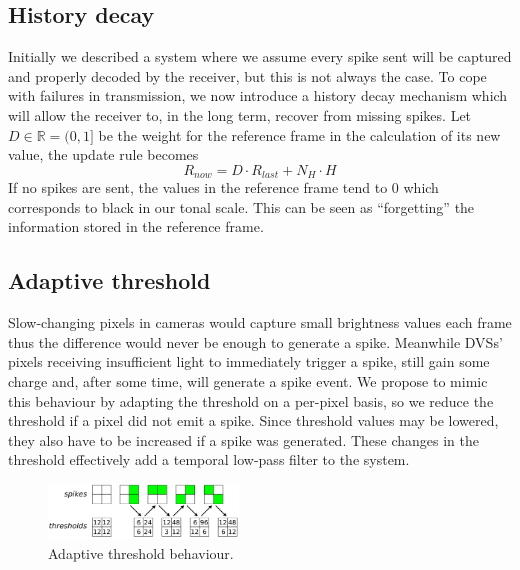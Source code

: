 \documentclass[conference]{IEEEtran}
\begin{document}
\subsection{History decay} %
\label{sec:hist_decay}
Initially we described a system where we assume every spike sent will be captured and properly decoded by the receiver, but this is not always the case. To cope with failures in transmission, we now introduce a history decay mechanism which will allow the receiver to, in the long term, recover from missing spikes. Let $D \in \mathbb{R} = (0, 1]$ be the weight for the reference frame in the calculation of its new value, the update rule becomes
\begin{equation}
\label{eq:ref_update_decay}
R_{now} = D\cdot R_{last} + N_{H}\cdot H
\end{equation}
If no spikes are sent, the values in the reference frame tend to 0 which corresponds to black in our tonal scale. This can be seen as ``forgetting'' the information stored in the reference frame.
%

\subsection{Adaptive threshold}
\label{sec:adaptive_thresh}
Slow-changing pixels in cameras would capture small brightness values each frame thus the difference would never be enough to generate a spike. Meanwhile DVSs' pixels receiving insufficient light to immediately trigger a spike, still gain some charge and, after some time, will generate a spike event. We propose to mimic this behaviour by adapting the threshold on a per-pixel basis, so we reduce the threshold if a pixel did not emit a spike. Since threshold values may be lowered, they also have to be increased if a spike was generated. These changes in the threshold effectively add a temporal low-pass filter to the system. 

%
\begin{figure}[hbt]
  \centering
  \includegraphics[width=0.45\textwidth]{adaptive_thresh_boxes}
  \caption{Adaptive threshold behaviour.}
  \label{fig:adpt_thresh}
\end{figure}
\end{document}
